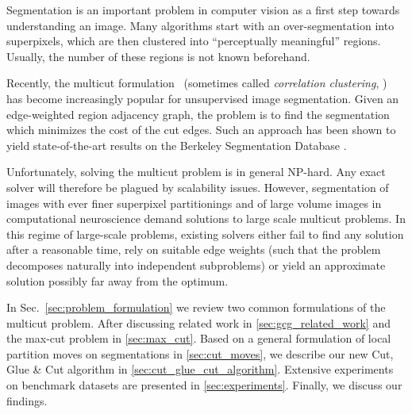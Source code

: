 Segmentation is an important problem in computer vision as a first step
towards understanding an image. Many algorithms start with an over-segmentation
into superpixels, which are then clustered into ``perceptually meaningful''
regions.
Usually, the number of these regions is not known beforehand.

Recently, the multicut formulation~\cite{chopra_1993_mp}
(sometimes called \emph{correlation clustering}, \cite{bansal_2004_ml})
has become increasingly popular for unsupervised
image segmentation.
Given an edge-weighted region adjacency graph,
the problem is to find the segmentation which
minimizes the cost of the cut edges.
Such an approach has been shown to yield
state-of-the-art results on the Berkeley Segmentation Database
\cite{andres_2011_iccv,yarkony_2012_eccv,alush_2013_simbad}.

Unfortunately, solving the multicut problem is in general NP-hard.
Any exact solver will therefore be plagued by scalability issues.
However, segmentation of images with ever finer superpixel
partitionings and of large volume images in computational neuroscience 
\cite{kroeger_2012_eccv}
demand solutions to large scale multicut problems.
%
In this regime of large-scale problems, existing solvers either
fail to find any solution after a reasonable time,
rely on suitable edge weights (such that the problem decomposes naturally
into independent subproblems) 
or yield an approximate solution possibly far away from the optimum.



In Sec.~\ref{sec:problem_formulation} we review two common formulations
of the multicut problem. After discussing related work in
\cref{sec:gcg_related_work} and 
the max-cut problem in \cref{sec:max_cut}.
Based on a general formulation of local partition moves on segmentations in
\cref{sec:cut_moves},
we describe our new Cut, Glue \& Cut algorithm
in \cref{sec:cut_glue_cut_algorithm}. Extensive experiments
on benchmark datasets are presented in \cref{sec:experiments}.
Finally, we discuss our findings.





